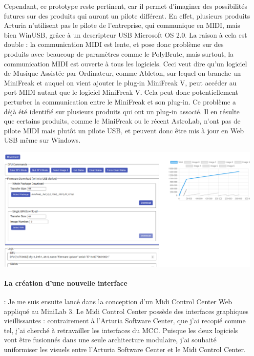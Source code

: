 \documentclass[francais]{rapportPFE}  %
\begin{document}
Cependant, ce prototype reste pertinent, car il permet d'imaginer des possibilités futures sur des produits qui auront un pilote différent.
En effet, plusieurs produits Arturia n'utilisent pas le pilote de l'entreprise, qui communique en MIDI, mais bien WinUSB, grâce à un descripteur USB Microsoft OS 2.0. La raison à cela est double : la communication MIDI est lente, et pose donc problème sur des produits avec beaucoup de paramètres comme le PolyBrute, mais surtout, la communication MIDI est ouverte à tous les logiciels. Ceci veut dire qu'un logiciel de Musique Assistée par Ordinateur, comme Ableton, sur lequel on branche un MiniFreak et auquel on vient ajouter le plug-in MiniFreak V, peut accéder au port MIDI autant que le logiciel MiniFreak V. Cela peut donc potentiellement perturber la communication entre le MiniFreak et son plug-in. Ce problème a déjà été identifié sur plusieurs produits qui ont un plug-in associé.
Il en résulte que certains produits, comme le MiniFreak ou le récent AstroLab, n'ont pas de pilote MIDI mais plutôt un pilote USB, et peuvent donc être mis à jour en Web USB même sur Windows.



\begin{center}
	\centering
	\includegraphics[width=15cm]{graphics/dfu.png}
	\begin{tiny}
	\end{tiny}
	\label{fig}
\end{center}


\paragraph{La création d'une nouvelle interface}:
Je me suis ensuite lancé dans la conception d'un Midi Control Center Web appliqué au MiniLab 3.
Le Midi Control Center possède des interfaces graphiques vieillissantes : contrairement à l'Arturia Software Center, que j'ai recopié comme tel, j'ai cherché à retravailler les interfaces du MCC. Puisque les deux logiciels vont être fusionnés dans une seule architecture modulaire, j'ai souhaité uniformiser les visuels entre l'Arturia Software Center et le Midi Control Center.
\end{document}
